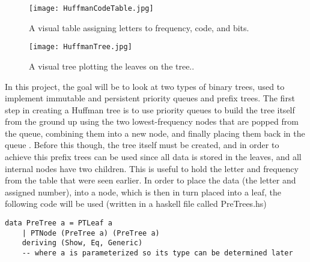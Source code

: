 \documentclass{article}
\begin{document}
\begin{figure}[htp]
    \centering
    \texttt{[image: HuffmanCodeTable.jpg]}
    \caption{A visual table assigning letters to frequency, code, and bits.}
    \label{fig: Haskell in Command Line}
\end{figure}

\begin{figure}[htp]
    \centering
    \texttt{[image: HuffmanTree.jpg]}
    \caption{A visual tree plotting the leaves on the tree..}
    \label{fig: Haskell in Command Line}
\end{figure}

In this project, the goal will be to look at two types of binary trees, used to implement immutable and persistent priority queues and prefix trees.
The first step in creating a Huffman tree is to use priority queues to build the tree itself from the ground up using the two lowest-frequency nodes that are popped from the queue, combining them into a new node, and finally placing them back in the queue \cite{19}.
Before this though, the tree itself must be created, and in order to achieve this prefix trees can be used since all data is stored in the leaves, and all internal nodes have two children. This is useful to hold the letter and frequency from the table that were seen earlier.
In order to place the data (the letter and assigned number), into a node, which is then in turn placed into a leaf, the following code will be used (written in a haskell file called PreTrees.hs)
\begin{lstlisting}
data PreTree a = PTLeaf a
    | PTNode (PreTree a) (PreTree a)
    deriving (Show, Eq, Generic)
    -- where a is parameterized so its type can be determined later
\end{lstlisting}
\end{document}
